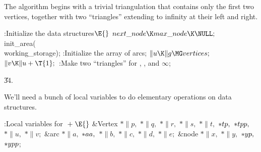 The algorithm begins with a trivial triangulation that contains
only the first two vertices, together with two ``triangles'' extending
to infinity at their left and right.

\Y\B\4:Initialize the data structures\X${}\E{}$\6
$\\{next\_node}\K\\{max\_node}\K\NULL;{}$\6
\\{init\_area}(\\{working\_storage});\6
:Initialize the array of arcs\X;\6
${}\|u\K\|g\MG\\{vertices};{}$\6
${}\|v\K\|u+\T{1};{}$\6
:Make two ``triangles'' for , , and $\infty$\X;\par
\U34.\fi

We'll need a bunch of local variables to do elementary operations on
data structures.

\Y\B\4:Local variables for \X${}\mathrel+\E{}$\6
\&{Vertex} ${}{*}\|p,{}$ ${}{*}\|q,{}$ ${}{*}\|r,{}$ ${}{*}\|s,{}$ ${}{*}%
\|t,{}$ ${}{*}\\{tp},{}$ ${}{*}\\{tpp},{}$ ${}{*}\|u,{}$ ${}{*}\|v;{}$\6
\&{arc} ${}{*}\|a,{}$ ${}{*}\\{aa},{}$ ${}{*}\|b,{}$ ${}{*}\|c,{}$ ${}{*}%
\|d,{}$ ${}{*}\|e;{}$\6
\&{node} ${}{*}\|x,{}$ ${}{*}\|y,{}$ ${}{*}\\{yp},{}$ ${}{*}\\{ypp}{}$;\par
\fi

